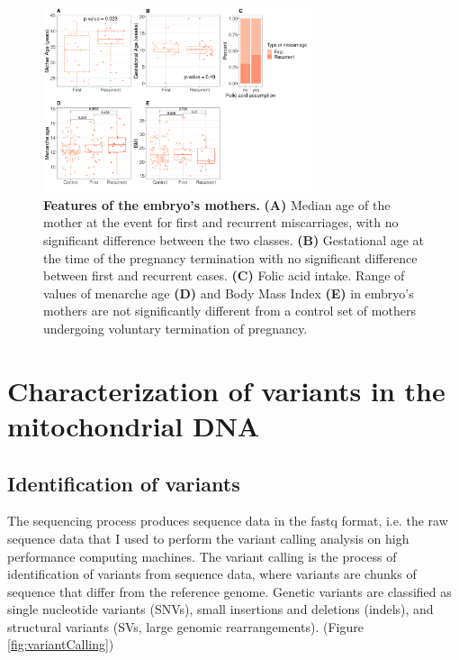 \begin{figure}[H]
\centering
\includegraphics[width=0.7\textwidth]{Fig/panel_stats.png}
\decoRule
\caption{\textbf{Features of the embryo's mothers.} \textbf{(A)} Median age of the mother at the event for first and recurrent miscarriages, with no significant difference between the two classes. \textbf{(B)} Gestational age at the time of the pregnancy termination with no significant difference between first and recurrent cases.  \textbf{(C)} Folic acid intake. Range of values of menarche age \textbf{(D)} and Body Mass Index \textbf{(E)} in embryo's mothers are not significantly different from a control set of mothers undergoing voluntary termination of pregnancy.}
\label{fig:mothers}
\end{figure}



\section{Characterization of variants in the mitochondrial DNA}




\subsection{Identification of variants}
The sequencing process produces sequence data in the \gls{fastq} format, i.e. the raw sequence data that I used to perform the variant calling analysis on high performance computing machines. %
The variant calling is the process of identification of variants from sequence data, where variants are chunks of sequence that differ from the reference genome. Genetic variants are classified as single nucleotide variants (SNVs), small insertions and deletions (indels), and structural variants (SVs, large genomic rearrangements). (Figure \ref{fig:variantCalling})

